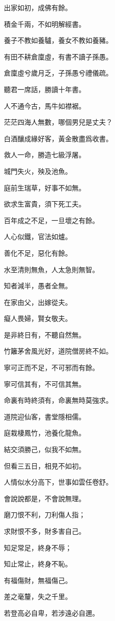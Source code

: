\documentclass[12pt,a4paper]{ctexbook}
\begin{document}
出家如初，成佛有餘。\par
積金千兩，不如明解經書。\par
養子不教如養驢，養女不教如養豬。\par
有田不耕倉廩虛，有書不讀子孫愚。\par
倉廩虛兮歲月乏，子孫愚兮禮儀疏。\par
聽君一席話，勝讀十年書。\par
人不通今古，馬牛如襟裾。\par
茫茫四海人無數，哪個男兒是丈夫？\par
白酒釀成緣好客，黃金散盡爲收書。\par
救人一命，勝造七級浮屠。\par
城門失火，殃及池魚。\par
庭前生瑞草，好事不如無。\par
欲求生富貴，須下死工夫。\par
百年成之不足，一旦壞之有餘。\par
人心似鐵，官法如爐。\par
善化不足，惡化有餘。\par
水至清則無魚，人太急則無智。\par
知者減半，愚者全無。\par
在家由父，出嫁從夫。\par
癡人畏婦，賢女敬夫。\par
是非終日有，不聽自然無。\par
竹籬茅舍風光好，道院僧房終不如。\par
寧可正而不足，不可邪而有餘。\par
寧可信其有，不可信其無。\par
命裏有時終須有，命裏無時莫強求。\par
道院迎仙客，書堂隱相儒。\par
庭栽棲鳳竹，池養化龍魚。\par
結交須勝己，似我不如無。\par
但看三五日，相見不如初。\par
人情似水分高下，世事如雲任卷舒。\par
會說說都是，不會說無理。\par
磨刀恨不利，刀利傷人指；\par
求財恨不多，財多害自己。\par
知足常足，終身不辱；\par
知止常止，終身不恥。\par
有福傷財，無福傷己。\par
差之毫釐，失之千里。\par
若登高必自卑，若涉遠必自邇。\par
\end{document}

